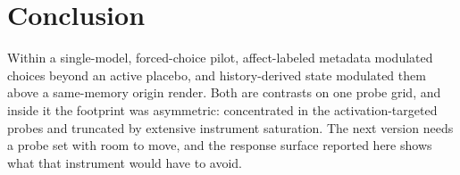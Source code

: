 \documentclass[sigconf]{acmart}
\begin{document}
\section{Conclusion}

Within a single-model, forced-choice pilot, affect-labeled metadata modulated choices beyond an active placebo, and history-derived state modulated them above a same-memory origin render. Both are contrasts on one probe grid, and inside it the footprint was asymmetric: concentrated in the activation-targeted probes and truncated by extensive instrument saturation. The next version needs a probe set with room to move, and the response surface reported here shows what that instrument would have to avoid.



\end{document}
